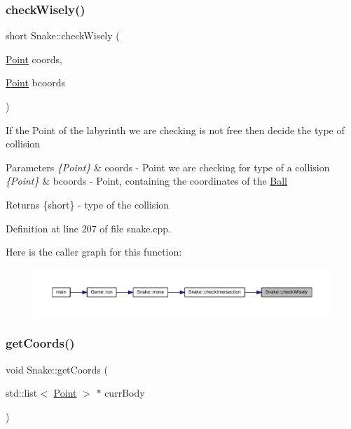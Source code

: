 \subsubsection{\texorpdfstring{checkWisely()}{checkWisely()}}
{\footnotesize\ttfamily short Snake\+::check\+Wisely (\begin{DoxyParamCaption}\item[{\mbox{\hyperlink{common_8h_aa9cfdb80b4ca12013a2de8a3b9b97981}{Point}}}]{coords,  }\item[{\mbox{\hyperlink{common_8h_aa9cfdb80b4ca12013a2de8a3b9b97981}{Point}}}]{bcoords }\end{DoxyParamCaption})\hspace{0.3cm}{\ttfamily [private]}}

If the Point of the labyrinth we are checking is not free then decide the type of collision 
\begin{DoxyParams}{Parameters}
{\em \{\+Point\}} & coords -\/ Point we are checking for type of a collision \\
\hline
{\em \{\+Point\}} & bcoords -\/ Point, containing the coordinates of the \mbox{\hyperlink{class_ball}{Ball}} \\
\hline
\end{DoxyParams}
\begin{DoxyReturn}{Returns}
\{short\} -\/ type of the collision 
\end{DoxyReturn}


Definition at line 207 of file snake.\+cpp.

Here is the caller graph for this function\+:
\nopagebreak
\begin{figure}[H]
\begin{center}
\leavevmode
\includegraphics[width=350pt]{class_snake_a2f8cc670284cdebf4c9bbe60a7296deb_icgraph}
\end{center}
\end{figure}
\mbox{\label{class_snake_a62fa59de03f60c23f6d1100c53594d71}} 
\subsubsection{\texorpdfstring{getCoords()}{getCoords()}}
{\footnotesize\ttfamily void Snake\+::get\+Coords (\begin{DoxyParamCaption}\item[{std\+::list$<$ \mbox{\hyperlink{common_8h_aa9cfdb80b4ca12013a2de8a3b9b97981}{Point}} $>$ $\ast$}]{curr\+Body }\end{DoxyParamCaption})}


